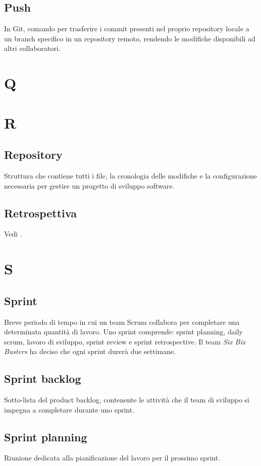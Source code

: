     \subsection{Push}
    In Git, comando per trasferire i commit presenti nel proprio repository locale a un 
    branch specifico in un repository remoto, rendendo le modifiche disponibili 
    ad altri collaboratori.

\pagebreak
\section{Q}
\pagebreak
\section{R}
    \subsection{Repository}
    \label{Repository}
    Struttura che contiene tutti i file, la cronologia delle modifiche e la 
    configurazione necessaria per gestire un progetto di sviluppo software.
    \subsection{Retrospettiva}
    Vedi .
\pagebreak
\section{S}
    \subsection{Sprint}
    \label{Sprint}
    Breve periodo di tempo in cui un team Scrum collabora per completare 
    una determinata quantità di lavoro. Uno sprint comprende:  
    sprint planning, daily scrum, lavoro di sviluppo, 
    sprint review e sprint retrospective. Il team \textit{Six Bix Busters} ha 
    deciso che ogni sprint durerà due settimane.
    \subsection{Sprint backlog}   
    \label{Sprint backlog}
    Sotto-lista del product backlog, contenente le attività che il team di sviluppo 
    si impegna a completare durante uno sprint.
    \subsection{Sprint planning}
    Riunione dedicata alla pianificazione del lavoro per il prossimo sprint. 
